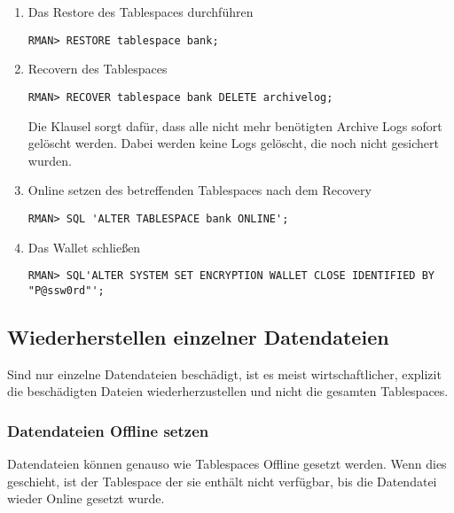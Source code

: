 \begin{enumerate}
            \item Das Restore des Tablespaces durchführen
              \begin{lstlisting}[caption={Restore des betreffenden Tablespaces},label=admin1466,language=rman]
RMAN> RESTORE tablespace bank;
              \end{lstlisting}
            \item Recovern des Tablespaces
              \begin{lstlisting}[caption={Recovery des Tablespaces},label=admin1467,language=rman]
RMAN> RECOVER tablespace bank DELETE archivelog;
              \end{lstlisting}
              Die Klausel  sorgt dafür, dass alle nicht mehr benötigten Archive Logs sofort gelöscht werden. Dabei werden keine Logs gelöscht, die noch nicht gesichert wurden.
            \item Online setzen des betreffenden Tablespaces nach dem Recovery
              \begin{lstlisting}[caption={Betreffenden Tablespace Online setzen},label=admin1468,language=rman,emph={[9]ALTER,TABLESPACE,ONLINE},emphstyle={[9]\color{magenta}\bfseries}]
RMAN> SQL 'ALTER TABLESPACE bank ONLINE';
              \end{lstlisting}
            \item Das Wallet schließen
              \begin{lstlisting}[caption={Schließen des Wallets},label=admin1469,language=rman,emph={[9]ALTER,SYSTEM,SET,ENCRYPTION,WALLET,CLOSE,IDENTIFIED,BY},emphstyle={[9]\color{magenta}\bfseries}]
RMAN> SQL'ALTER SYSTEM SET ENCRYPTION WALLET CLOSE IDENTIFIED BY "P@ssw0rd"';
              \end{lstlisting}
          \end{enumerate}
      \subsection{Wiederherstellen einzelner Datendateien}
        Sind nur einzelne Datendateien beschädigt, ist es meist wirtschaftlicher, explizit die beschädigten Dateien wiederherzustellen und nicht die gesamten Tablespaces.
        \subsubsection{Datendateien Offline setzen}
          Datendateien können genauso wie Tablespaces Offline gesetzt werden. Wenn dies geschieht, ist der Tablespace der sie enthält nicht verfügbar, bis die Datendatei wieder Online gesetzt wurde.

